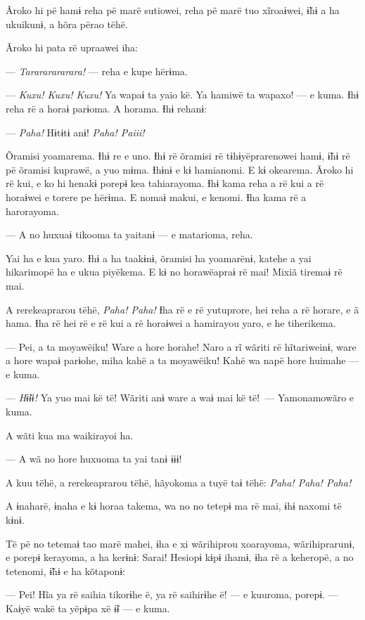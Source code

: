 Ãroko hi pë hamɨ reha pë marë sutiowei, reha pë marë tuo xĩroaɨwei, 
ɨ̃hɨ a ha ukuikunɨ, a hõra përao tëhë. 

Ãroko hi pata rë upraawei iha:

--- \textit{Tarararararara!} --- reha e kupe hërɨma. 

--- \textit{Kuxu! Kuxu! Kuxu!} Ya wapaɨ ta yaio kë. Ya hamiwë ta wapaxo! --- e
 kuma. Ɨhɨ reha rë a horaɨ parɨoma. A horama. Ɨhɨ rehanɨ: 

--- \textit{Paha!} Hɨtɨtɨ anɨ! \textit{Paha! Paiii!} 

Õramisi yoamarema. Ɨhɨ re e uno. Ɨhɨ rë õramisi rë tɨhɨyëprarenowei
 hamɨ, ɨ̃hɨ rë pë õramisi kuprawë, a yuo mɨma. Ɨhɨnɨ e kɨ hamianomi. E kɨ
 okearema. Ãroko hi rë kui, e ko hi henakɨ porepɨ kea tahiarayoma. Ɨhɨ
 kama reha a rë kui a rë horaɨwei e torere pe hërɨma. E nomaɨ makui, e
 kenomi. Ɨha kama rë a harorayoma. 

--- A no huxuaɨ tikooma ta yaitanɨ --- e matarioma, reha. 

Yai ha e kua yaro. Ɨhɨ a ha taakɨnɨ, õramisi ha yoamarënɨ, katehe a yai
hikarimopë ha e ukua piyëkema. E kɨ no horawëapraɨ rë mai! Mixiã tiremaɨ
rë mai. 

A rerekeaprarou tëhë, \textit{Paha! Paha!} Ɨha rë e rë yutuprore, hei reha a rë
horare, e ã hama. Ɨha rë hei rë e rë kui a rë horaɨwei a hamirayou yaro,
e he tiherikema. 

--- Pei, a ta moyawëiku! Ware a hore horahe! Naro a rĩ wãriti rë
hĩtariweinɨ, ware a hore wapaɨ parɨohe, miha kahë a ta moyawëiku! Kahë
wa napë hore huimahe --- e kuma. 

--- \textit{Hɨ̃ɨɨ!} Ya yuo mai kë të! Wãriti anɨ ware a waɨ mai kë të!~--- Yamonamowãro e kuma. 

A wãti kua ma waikirayoi ha. 

--- A wã no hore huxuoma ta yai tanɨ ɨɨɨ!

A kuu tëhë, a rerekeaprarou tëhë, hãyokoma a tuyë taɨ tëhë: \textit{Paha! Paha!
Paha!} 

A ɨnaharë, ɨnaha e kɨ horaa takema, wa no no tetepɨ ma rë mai, ɨhɨ
naxomi të kɨnɨ. 

Të pë no tetemaɨ tao marë mahei, ɨha e xi wãrihiprou xoarayoma,
wãrihiprarunɨ, e porepɨ kerayoma, a ha kerɨnɨ: Sarai! Hesiopɨ kɨpɨ
ihamɨ, ɨha rë a keheropë, a no tetenomi, ɨ̃hɨ e ha kõtaponɨ:

--- Pei! Hĩa ya rë saihia tikorɨhe ë, ya rë saihirɨhe ë! --- e kuuroma,
porepɨ. --- Kaɨyë wakë ta yëpɨpa xë ɨ̃ɨ --- e kuma. 

